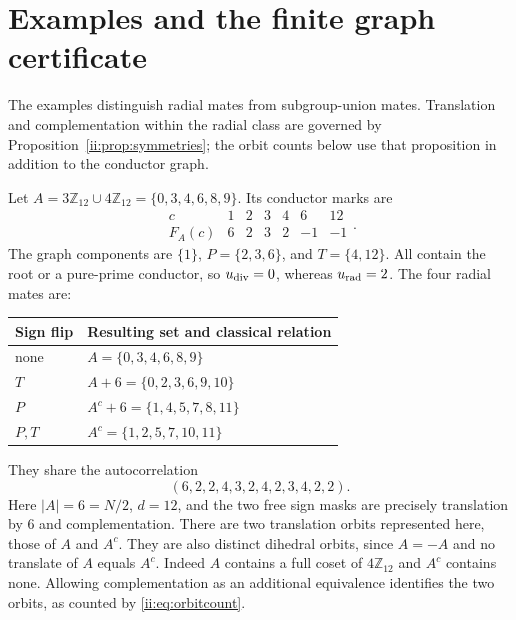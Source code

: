 \section{Examples and the finite graph certificate}

The examples distinguish radial mates from subgroup-union mates.
Translation and complementation within the radial class are governed
by Proposition~\ref{ii:prop:symmetries}; the orbit counts below use that
proposition in addition to the conductor graph.

\begin{example}[The classical four-set orbit at $N=12$]\label{ii:ex:12}
Let $A=3\mathbb Z_{12}\cup4\mathbb Z_{12}=\{0,3,4,6,8,9\}$.  Its conductor marks are
\[
 \begin{array}{c|rrrrrr}
 c&1&2&3&4&6&12\\\hline
 F_A(c)&6&2&3&2&-1&-1
 \end{array}.
\]
The graph components are $\{1\}$, $P=\{2,3,6\}$, and $T=\{4,12\}$.  All contain the root or a pure-prime conductor, so $u_{\rm div}=0$, whereas $u_{\rm rad}=2$.  The four radial mates are:
\begin{center}\small
\begin{tabular}{@{}ll@{}}\toprule
Sign flip & Resulting set and classical relation\\\midrule
none & $A=\{0,3,4,6,8,9\}$\\
$T$ & $A+6=\{0,2,3,6,9,10\}$\\
$P$ & $A^c+6=\{1,4,5,7,8,11\}$\\
$P,T$ & $A^c=\{1,2,5,7,10,11\}$\\\bottomrule
\end{tabular}
\end{center}
They share the autocorrelation
\[
 (6,2,2,4,3,2,4,2,3,4,2,2).
\]
Here $|A|=6=N/2$, $d=12$, and the two free sign masks are precisely translation by $6$ and complementation.  There are two translation orbits represented here, those of $A$ and $A^c$. They are also distinct dihedral orbits, since $A=-A$ and no translate of $A$ equals $A^c$. Indeed $A$ contains a full coset of $4\mathbb Z_{12}$ and $A^c$ contains none. Allowing complementation as an additional equivalence identifies the two orbits, as counted by \eqref{ii:eq:orbitcount}.
\end{example}

